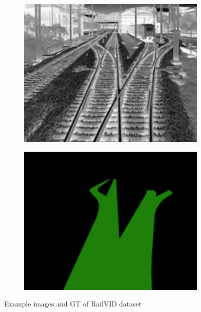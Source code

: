 \begin{figure}[H]
\begin{subfigure}{0.24\textwidth}
        \centering
        \includegraphics[width=\linewidth]{PICs/datasets/railVID_dataset/railVID_switch.png}
    \end{subfigure}
    \hfill
    \begin{subfigure}{0.24\textwidth}
        \centering
        \includegraphics[width=\linewidth]{PICs/datasets/railVID_dataset/railVID_switch_label.png}
    \end{subfigure}
    \caption{Example images and \ac{GT} of RailVID dataset \cite{yuan2022railvid}}
    \label{fig:railVID_dataset_images}
\end{figure}

